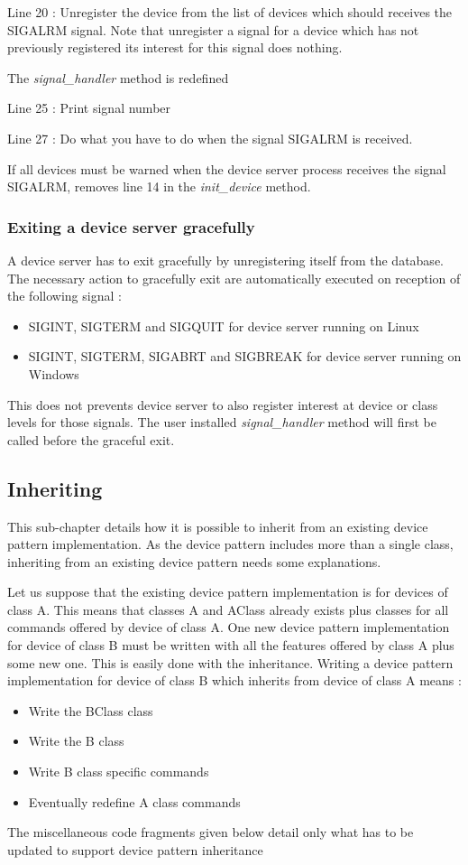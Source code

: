 Line 20 : Unregister the device from the list of devices which should
receives the SIGALRM signal. Note that unregister a signal for a device
which has not previously registered its interest for this signal does
nothing.

The \emph{signal\_handler} method is redefined

Line 25 : Print signal number

Line 27 : Do what you have to do when the signal SIGALRM is received.

If all devices must be warned when the device server process receives
the signal SIGALRM, removes line 14 in the \emph{init\_device} method.


\subsubsection{Exiting a device server gracefully}

A device server has to exit gracefully
by unregistering itself from the database. The necessary action to
gracefully exit are automatically executed on reception of the following
signal :
\begin{itemize}
\item SIGINT, SIGTERM and SIGQUIT for device server running on Linux
\item SIGINT, SIGTERM, SIGABRT and SIGBREAK for device server running on
Windows
\end{itemize}
This does not prevents device server to also register interest at
device or class levels for those signals. The user installed \emph{signal\_handler}
method will first be called before the graceful exit.


\subsection{Inheriting\label{Inheriting}}

This sub-chapter details how it is possible to inherit
from an existing device pattern implementation. As the device pattern
includes more than a single class, inheriting from an existing device
pattern needs some explanations.

Let us suppose that the existing device pattern implementation is
for devices of class A. This means that classes A and AClass already
exists plus classes for all commands offered by device of class A.
One new device pattern implementation for device of
class B must be written with all the features offered by class A plus
some new one. This is easily done with the inheritance. Writing a
device pattern implementation for device of class B which inherits
from device of class A means :
\begin{itemize}
\item Write the BClass class
\item Write the B class
\item Write B class specific commands
\item Eventually redefine A class commands
\end{itemize}
The miscellaneous code fragments given below detail only what has
to be updated to support device pattern inheritance


